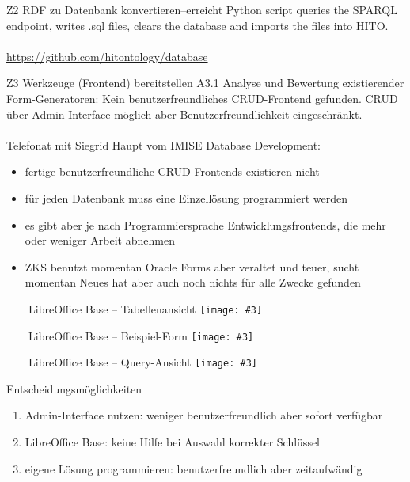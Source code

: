 \documentclass[aspectratio=169]{beamer}
\newcommand{\imageslide}[4][]
{
\begin{frame}[plain]{~~~~#2}
\vspace{0.2em}
\centering\texttt{[image: \#3]}
\\#1
\note{#4}
\end{frame}
}
\begin{document}
\begin{frame}{Z2 RDF zu Datenbank konvertieren--erreicht}
\url{}
Python script queries the SPARQL endpoint, writes .sql files, clears the database and imports the files into HITO.\\
~\\
\centering\url{https://github.com/hitontology/database}
\end{frame}

\begin{frame}{Z3 Werkzeuge (Frontend) bereitstellen}
A3.1 Analyse und Bewertung existierender Form-Generatoren: Kein benutzerfreundliches CRUD-Frontend gefunden.
CRUD über Admin-Interface möglich aber Benutzerfreundlichkeit eingeschränkt.\\
~\\
Telefonat mit Siegrid Haupt vom IMISE Database Development:\\
\begin{itemize}
\item fertige benutzerfreundliche CRUD-Frontends existieren nicht
\item für jeden Datenbank muss eine Einzellösung programmiert werden
\item es gibt aber je nach Programmiersprache Entwicklungsfrontends, die mehr oder weniger Arbeit abnehmen
\item ZKS benutzt momentan Oracle Forms aber veraltet und teuer, sucht momentan Neues hat aber auch noch nichts für alle Zwecke gefunden
\end{itemize}
\end{frame}

\imageslide{LibreOffice Base -- Tabellenansicht}{img_neu/base-tables.png}{}
\imageslide{LibreOffice Base -- Beispiel-Form}{img_neu/base-form.png}{}
\imageslide{LibreOffice Base -- Query-Ansicht}{img_neu/base-query.png}{}

\begin{frame}{Entscheidungsmöglichkeiten}
\begin{enumerate}
\item Admin-Interface nutzen: weniger benutzerfreundlich aber sofort verfügbar
\item LibreOffice Base: keine Hilfe bei Auswahl korrekter Schlüssel
\item eigene Lösung programmieren: benutzerfreundlich aber zeitaufwändig
\end{enumerate}
\end{frame}
\end{document}

